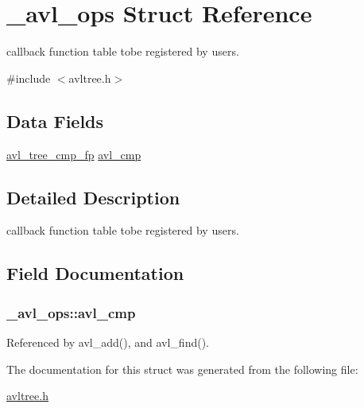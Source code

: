\hypertarget{struct__avl__ops}{\section{\-\_\-avl\-\_\-ops Struct Reference}
\label{struct__avl__ops}
}


callback function table tobe registered by users.  




{\ttfamily \#include $<$avltree.\-h$>$}

\subsection*{Data Fields}
\begin{DoxyCompactItemize}
\item 
\hyperlink{avltree_8h_ad98134ca35db25505e6409d88cba13b1}{avl\-\_\-tree\-\_\-cmp\-\_\-fp} \hyperlink{struct__avl__ops_abbbf00ecbd8c00a6552c2db35f10ce15}{avl\-\_\-cmp}
\end{DoxyCompactItemize}


\subsection{Detailed Description}
callback function table tobe registered by users. 

\subsection{Field Documentation}
\hypertarget{struct__avl__ops_abbbf00ecbd8c00a6552c2db35f10ce15}{
\subsubsection[{avl\-\_\-cmp}]{ \-\_\-avl\-\_\-ops\-::avl\-\_\-cmp}}\label{struct__avl__ops_abbbf00ecbd8c00a6552c2db35f10ce15}


Referenced by avl\-\_\-add(), and avl\-\_\-find().



The documentation for this struct was generated from the following file\-:\begin{DoxyCompactItemize}
\item 
\hyperlink{avltree_8h}{avltree.\-h}\end{DoxyCompactItemize}
